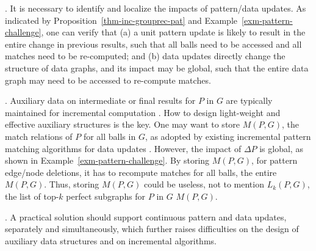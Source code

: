 

. It is necessary to identify and localize the impacts of pattern/data updates.
As indicated by Proposition~\ref{thm-inc-grouprec-pat} and Example~\ref{exm-pattern-challenge},
one can verify that (a) a unit pattern update is likely to result in the entire change in previous results,
such that all balls need to be accessed and all matches need to be re-computed;
%
and (b) data updates directly change the structure of data graphs, and its impact may be global, such that the entire data graph may need to be accessed to re-compute matches.



.
Auxiliary data on intermediate or final results for $P$ in $G$ are typically maintained for incremental computation \cite{Reps96,FanWW13-tods}.
How to design light-weight and effective auxiliary structures is the key.
One may want to store $M(P,G)$, the match relations of $P$ for all balls in $G$,
as adopted by existing incremental pattern matching algorithms for data updates \cite{FanWW13-tods}.
However, the impact of $\Delta P$ is global, as shown in Example~\ref{exm-pattern-challenge}.
By storing $M(P,G)$, for pattern edge/node deletions, it has to recompute matches for all balls, \ie the entire $M(P,G)$.
Thus, storing $M(P,G)$ could be useless, not to mention $L_{k}(P,G)$, the list of top-$k$ perfect subgraphs for $P$ in $G$ \wrt $M(P,G)$.

.
A practical solution should support continuous pattern and data updates, separately and simultaneously, which further raises difficulties on the design of auxiliary data structures and on incremental algorithms.

